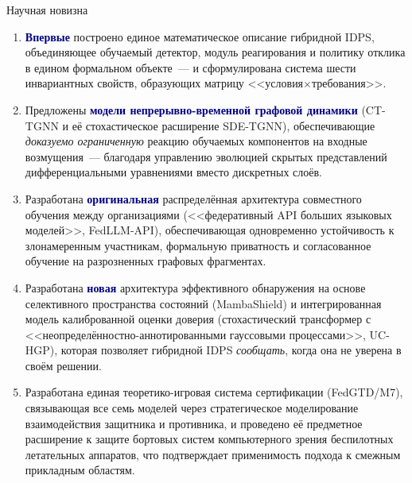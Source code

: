 \documentclass[10pt,aspectratio=169]{beamer}
\newcommand{\bn}[1]{\textcolor{navy}{\textbf{#1}}}
\begin{document}
\begin{frame}{Научная новизна}
\footnotesize
\begin{enumerate}\setlength\itemsep{4pt}
\item \bn{Впервые} построено единое математическое описание
гибридной IDPS, объединяющее обучаемый детектор, модуль
реагирования и политику отклика в едином формальном
объекте~--- и сформулирована система шести инвариантных
свойств, образующих матрицу <<условия$\times$требования>>.

\item Предложены \bn{модели непрерывно-временной графовой
динамики} (CT-TGNN и её стохастическое расширение SDE-TGNN),
обеспечивающие \emph{доказуемо ограниченную} реакцию
обучаемых компонентов на входные возмущения~--- благодаря
управлению эволюцией скрытых представлений
дифференциальными уравнениями вместо дискретных слоёв.

\item Разработана \bn{оригинальная} распределённая
архитектура совместного обучения между организациями
(<<федеративный API больших языковых моделей>>, FedLLM-API),
обеспечивающая одновременно устойчивость к злонамеренным
участникам, формальную приватность и согласованное
обучение на разрозненных графовых фрагментах.

\item Разработана \bn{новая} архитектура эффективного
обнаружения на основе селективного пространства состояний
(MambaShield) и интегрированная модель калиброванной
оценки доверия (стохастический трансформер с
<<неопределённостно-аннотированными гауссовыми процессами>>,
UC-HGP), которая позволяет гибридной IDPS \emph{сообщать},
когда она не уверена в своём решении.

\item Разработана единая теоретико-игровая система
сертификации (FedGTD/M7), связывающая все семь моделей
через стратегическое моделирование взаимодействия защитника
и противника, и проведено её предметное расширение к защите
бортовых систем компьютерного зрения беспилотных летательных
аппаратов, что подтверждает применимость подхода к смежным
прикладным областям.
\end{enumerate}
\end{frame}
\end{document}
